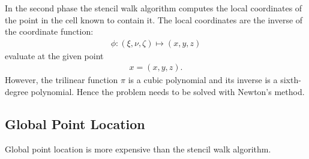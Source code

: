 In the second phase the stencil walk algorithm computes the local coordinates of the point in the cell known to contain it. The local coordinates are the inverse of the coordinate function:
\begin{align*}
    \phi: (\xi, \nu,\zeta)\mapsto (x,y,z)
\end{align*}
evaluate at the given point 
\begin{align*}
 x= (x,y,z).
\end{align*}
However, the trilinear function $\pi$ is a cubic polynomial and its inverse is a sixth-degree polynomial. Hence the problem needs to be solved with Newton's method.

\subsection{Global Point Location}
Global point location is more expensive than the stencil walk algorithm.

